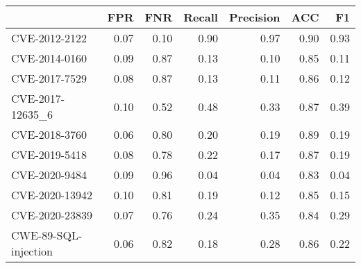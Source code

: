 \begin{tabular}{lrrrrrr}
\toprule
{} &  FPR &  FNR &  Recall &  Precision &  ACC &   F1 \\
\midrule
CVE-2012-2122        & 0.07 & 0.10 &    0.90 &       0.97 & 0.90 & 0.93 \\
CVE-2014-0160        & 0.09 & 0.87 &    0.13 &       0.10 & 0.85 & 0.11 \\
CVE-2017-7529        & 0.08 & 0.87 &    0.13 &       0.11 & 0.86 & 0.12 \\
CVE-2017-12635\_6     & 0.10 & 0.52 &    0.48 &       0.33 & 0.87 & 0.39 \\
CVE-2018-3760        & 0.06 & 0.80 &    0.20 &       0.19 & 0.89 & 0.19 \\
CVE-2019-5418        & 0.08 & 0.78 &    0.22 &       0.17 & 0.87 & 0.19 \\
CVE-2020-9484        & 0.09 & 0.96 &    0.04 &       0.04 & 0.83 & 0.04 \\
CVE-2020-13942       & 0.10 & 0.81 &    0.19 &       0.12 & 0.85 & 0.15 \\
CVE-2020-23839       & 0.07 & 0.76 &    0.24 &       0.35 & 0.84 & 0.29 \\
CWE-89-SQL-injection & 0.06 & 0.82 &    0.18 &       0.28 & 0.86 & 0.22 \\
\bottomrule
\end{tabular}
